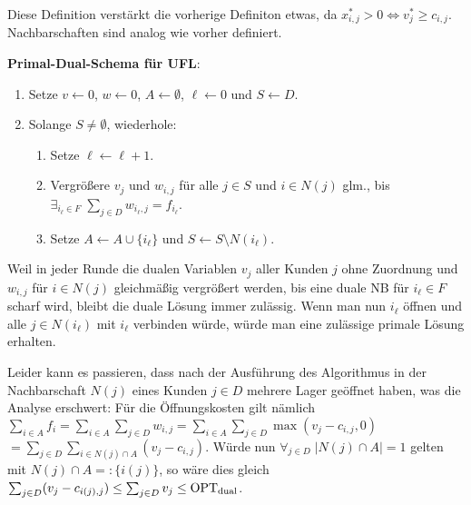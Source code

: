 Diese Definition verstärkt die vorherige Definiton etwas, da
$x_{i,j}^\ast > 0 \iff v_j^\ast \ge c_{i,j}$.\\
Nachbarschaften sind analog wie vorher definiert.

\linie

\textbf{Primal-Dual-Schema für UFL}:
\begin{enumerate}
    \item
    Setze $v \leftarrow 0$,
    $w \leftarrow 0$,
    $A \leftarrow \emptyset$,
    $\ell \leftarrow 0$ und
    $S \leftarrow D$.
    
    \item
    Solange $S \not= \emptyset$, wiederhole:
    \begin{enumerate}
        \item
        Setze $\ell \leftarrow \ell + 1$.
        
        \item
        Vergrößere $v_j$ und $w_{i,j}$ für alle $j \in S$ und $i \in N(j)$ glm.,
        bis $\exists_{i_\ell \in F}\; \sum_{j \in D} w_{i_\ell,j} = f_{i_\ell}$.
        
        \item
        Setze $A \leftarrow A \cup \{i_\ell\}$
        und $S \leftarrow S \setminus N(i_\ell)$.
    \end{enumerate}
\end{enumerate}

Weil in jeder Runde die dualen Variablen $v_j$ aller Kunden $j$ ohne Zuordnung
und $w_{i,j}$ für $i \in N(j)$ gleichmäßig vergrößert werden,
bis eine duale NB für $i_\ell \in F$ scharf wird,
bleibt die duale Lösung immer zulässig.
Wenn man nun $i_\ell$ öffnen und alle $j \in N(i_\ell)$ mit $i_\ell$ verbinden würde,
würde man eine zulässige primale Lösung erhalten.

Leider kann es passieren, dass nach der Ausführung des Algorithmus
in der Nachbarschaft $N(j)$ eines Kunden $j \in D$ mehrere Lager geöffnet haben,
was die Analyse erschwert:
Für die Öffnungskosten gilt nämlich
$\sum_{i \in A} f_i
= \sum_{i \in A} \sum_{j \in D} w_{i,j}
= \sum_{i \in A} \sum_{j \in D} \max(v_j - c_{i,j}, 0)$\\
$= \sum_{j \in D} \sum_{i \in N(j) \cap A} (v_j - c_{i,j})$.
Würde nun $\forall_{j \in D}\; |N(j) \cap A| = 1$ gelten mit $N(j) \cap A =: \{i(j)\}$,
so wäre dies gleich
$\sum_{j \in D} (v_j - c_{i(j),j})
\le \sum_{j \in D} v_j \le \text{OPT}_\text{dual}$.

